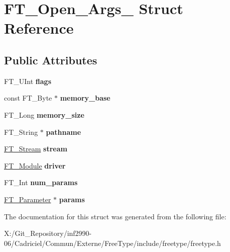\hypertarget{struct_f_t___open___args__}{\section{F\-T\-\_\-\-Open\-\_\-\-Args\-\_\- Struct Reference}
\label{struct_f_t___open___args__}
}
\subsection*{Public Attributes}
\begin{DoxyCompactItemize}
\item 
\hypertarget{struct_f_t___open___args___a2e3e6b9284fe8b4d9833e247a19181fa}{F\-T\-\_\-\-U\-Int {\bfseries flags}}\label{struct_f_t___open___args___a2e3e6b9284fe8b4d9833e247a19181fa}

\item 
\hypertarget{struct_f_t___open___args___a1231da51bc58922096b3bc603bb2ffb0}{const F\-T\-\_\-\-Byte $\ast$ {\bfseries memory\-\_\-base}}\label{struct_f_t___open___args___a1231da51bc58922096b3bc603bb2ffb0}

\item 
\hypertarget{struct_f_t___open___args___a87f0bb2f257abe94c93a79e0de3525da}{F\-T\-\_\-\-Long {\bfseries memory\-\_\-size}}\label{struct_f_t___open___args___a87f0bb2f257abe94c93a79e0de3525da}

\item 
\hypertarget{struct_f_t___open___args___aea3d454d9fd9bb7434aad07e651d027b}{F\-T\-\_\-\-String $\ast$ {\bfseries pathname}}\label{struct_f_t___open___args___aea3d454d9fd9bb7434aad07e651d027b}

\item 
\hypertarget{struct_f_t___open___args___ae1e6444bf0c21b323ce6cbe8bc475b2b}{\hyperlink{struct_f_t___stream_rec__}{F\-T\-\_\-\-Stream} {\bfseries stream}}\label{struct_f_t___open___args___ae1e6444bf0c21b323ce6cbe8bc475b2b}

\item 
\hypertarget{struct_f_t___open___args___a7c01bd7e34a440c3e89141ee521e2646}{\hyperlink{struct_f_t___module_rec__}{F\-T\-\_\-\-Module} {\bfseries driver}}\label{struct_f_t___open___args___a7c01bd7e34a440c3e89141ee521e2646}

\item 
\hypertarget{struct_f_t___open___args___afaf47d9e1631f2147b696fd7f5a6f4eb}{F\-T\-\_\-\-Int {\bfseries num\-\_\-params}}\label{struct_f_t___open___args___afaf47d9e1631f2147b696fd7f5a6f4eb}

\item 
\hypertarget{struct_f_t___open___args___a77b279a34beba29bc14901926f79818f}{\hyperlink{struct_f_t___parameter__}{F\-T\-\_\-\-Parameter} $\ast$ {\bfseries params}}\label{struct_f_t___open___args___a77b279a34beba29bc14901926f79818f}

\end{DoxyCompactItemize}


The documentation for this struct was generated from the following file\-:\begin{DoxyCompactItemize}
\item 
X\-:/\-Git\-\_\-\-Repository/inf2990-\/06/\-Cadriciel/\-Commun/\-Externe/\-Free\-Type/include/freetype/freetype.\-h\end{DoxyCompactItemize}
